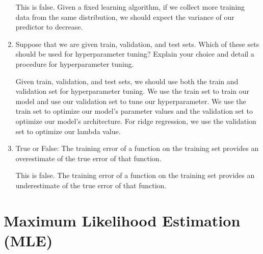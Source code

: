 \documentclass{article}
\begin{document}
\begin{aprob}
\begin{enumerate}
        This is false. Given a fixed learning algorithm, if we collect more training data from the same distribution, we should expect the variance of our predictor to decrease. 
        
        \item {} Suppose that we are given train, validation, and test sets. Which of these sets should be used for hyperparameter tuning? Explain your choice and detail a procedure for hyperparameter tuning.
        
        Given train, validation, and test sets, we should use both the train and validation set for hyperparameter tuning. We use the train set to train our model and use our validation set to tune our hyperparameter. We use the train set to optimize our model's parameter values and the validation set to optimize our model's architecture. For ridge regression, we use the validation set to optimize our lambda value.
        
        \item {} True or False: The training error of a function on the training set provides an overestimate of the true error of that function.
        
        This is false. The training error of a function on the training set provides an underestimate of the true error of that function.
        
    \end{enumerate}
    
\end{aprob}
\newpage

\section*{Maximum Likelihood Estimation (MLE)}
\end{document}

